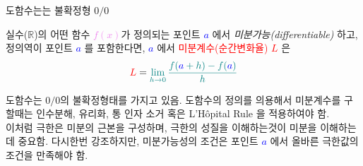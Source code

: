 \documentclass[aspectratio=169]{beamer}
\begin{document}
\begin{frame}{도함수는는 불확정형 $ 0 / 0 $}
  \begin{definition}[도함수]
    실수($\mathbb{R}$)의 어떤 함수 \textcolor{violet}{$f(x)$}가 정의되는 포인트 \textcolor{blue}{\emph{$a$}} 에서 \emph{미분가능(differentiable)} 하고, 정의역이 포인트 \textcolor{blue}{\emph{$a$}} 를 포함한다면, \textcolor{blue}{\emph{$a$}} 에서 \textcolor{red}{미분계수(순간변화율)} \textcolor{red}{\emph{$L$}} 은 \\
    \begin{equation}
      \textcolor{red}{L} = \textcolor{teal}{\lim_{h \to 0} \frac{f(\textcolor{blue}{a}+h)-f(\textcolor{blue}{a})}{h}}
    \end{equation}
  \end{definition}
  \vspace{10pt}
  도함수는 $0/0$의 불확정형태를 가지고 있음. 도함수의 정의를 의용해서 미분계수를 구할때는 인수분해, 유리화, 통 인자 소거 혹은 L'Hôpital Rule 을 적용하여야 함. \\
  이처럼 극한은 미분의 근본을 구성하며, 극한의 성질을 이해하는것이 미분을 이해하는데 중요함. 다시한번 강조하지만, 미분가능성의 조건은 포인트 \textcolor{blue}{\emph{$a$}} 에서 올바른 극한값의 조건을 만족해야 함.
\end{frame}
\end{document}
